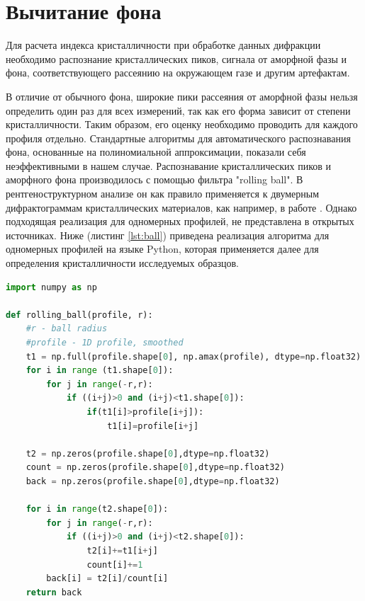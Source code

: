 	\section{Вычитание фона}
	
	Для расчета индекса кристалличности при обработке данных дифракции необходимо распознание кристаллических пиков, сигнала от аморфной фазы и фона, соответствующего рассеянию на окружающем газе и другим артефактам.
	
	В отличие от обычного фона, широкие пики рассеяния от аморфной фазы нельзя определить один раз для всех измерений, так как его форма зависит от степени кристалличности. Таким образом, его оценку необходимо проводить для каждого профиля отдельно.
	Стандартные алгоритмы для автоматического распознавания фона, основанные на полиномиальной аппроксимации, показали себя неэффективными в нашем случае. Распознавание кристаллических пиков и аморфного фона производилось с помощью фильтра "rolling ball". В рентгеноструктурном анализе он как правило применяется к двумерным дифрактограммам кристаллических материалов, как например, в работе \cite{ball2018}. Однако подходящая реализация для одномерных профилей, не представлена в открытых источниках. Ниже (листинг \ref{lst:ball}) приведена реализация алгоритма для одномерных профилей на языке Python, которая применяется далее для определения кристалличности исследуемых образцов.
	 
\vspace{5px}
	\begin{lstlisting}[language=Python, caption=Алгоритм распознавания фона, label={lst:ball}]
import numpy as np

def rolling_ball(profile, r):
    #r - ball radius
    #profile - 1D profile, smoothed
    t1 = np.full(profile.shape[0], np.amax(profile), dtype=np.float32)
    for i in range (t1.shape[0]):
        for j in range(-r,r):
            if ((i+j)>0 and (i+j)<t1.shape[0]):
                if(t1[i]>profile[i+j]):
                    t1[i]=profile[i+j]
                    
    t2 = np.zeros(profile.shape[0],dtype=np.float32)
    count = np.zeros(profile.shape[0],dtype=np.float32)
    back = np.zeros(profile.shape[0],dtype=np.float32) 
    
    for i in range(t2.shape[0]): 
        for j in range(-r,r):
            if ((i+j)>0 and (i+j)<t2.shape[0]):
                t2[i]+=t1[i+j]
                count[i]+=1
        back[i] = t2[i]/count[i]
    return back
 

\end{lstlisting}
\vspace{5px}

